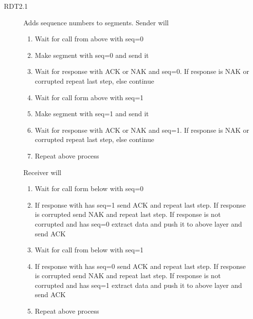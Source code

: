 \documentclass{article}
\begin{document}
\begin{description}
    \item[RDT2.1] Adds sequence numbers to segments. Sender will
    \begin{enumerate}
        \item Wait for call from above with seq=0
        \item Make segment with seq=0 and send it
        \item Wait for response with ACK or NAK and seq=0. If response is NAK or corrupted repeat last step,
        else continue
        \item Wait for call form above with seq=1
        \item Make segment with seq=1 and send it
        \item Wait for response with ACK or NAK and seq=1. If response is NAK or corrupted repeat last step,
        else continue
        \item Repeat above process
    \end{enumerate}
    Receiver will
    \begin{enumerate}
        \item Wait for call form below with seq=0
        \item If response with has seq=1 send ACK and repeat last step. If response is corrupted send 
        NAK and repeat last step. If response is not corrupted and has seq=0 extract data and push it 
        to above layer and send ACK
        \item Wait for call from below with seq=1
        \item If response with has seq=0 send ACK and repeat last step. If response is corrupted send 
        NAK and repeat last step. If response is not corrupted and has seq=1 extract data and push it 
        to above layer and send ACK
        \item Repeat above process
    \end{enumerate}
    

\end{description}
\end{document}
